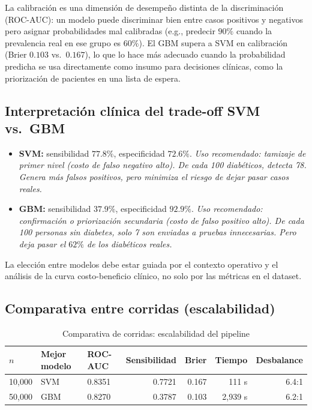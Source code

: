 \documentclass[12pt,a4paper]{article}
\begin{document}
La calibración es una dimensión de desempeño distinta de la discriminación (ROC-AUC): un modelo puede discriminar bien entre casos positivos y negativos pero asignar probabilidades mal calibradas (e.g., predecir $90\%$ cuando la prevalencia real en ese grupo es $60\%$). El GBM supera a SVM en calibración (Brier $0.103$ vs.\ $0.167$), lo que lo hace más adecuado cuando la probabilidad predicha se usa directamente como insumo para decisiones clínicas, como la priorización de pacientes en una lista de espera.

\subsection{Interpretación clínica del trade-off SVM vs.\ GBM}

\begin{infobox}
  \begin{itemize}[noitemsep]
    \item \textbf{SVM:} sensibilidad $77.8\%$, especificidad $72.6\%$.
    \textit{Uso recomendado: tamizaje de primer nivel (costo de falso negativo alto).
    De cada 100 diabéticos, detecta 78. Genera más falsos positivos, pero minimiza
    el riesgo de dejar pasar casos reales.}

    \item \textbf{GBM:} sensibilidad $37.9\%$, especificidad $92.9\%$.
    \textit{Uso recomendado: confirmación o priorización secundaria (costo de falso
    positivo alto). De cada 100 personas sin diabetes, solo 7 son enviadas a pruebas
    innecesarias. Pero deja pasar el $62\%$ de los diabéticos reales.}
  \end{itemize}
  La elección entre modelos debe estar guiada por el contexto operativo y el análisis
  de la curva costo-beneficio clínico, no solo por las métricas en el dataset.
\end{infobox}

\subsection{Comparativa entre corridas (escalabilidad)}

\begin{table}[H]
  \centering
  \caption{Comparativa de corridas: escalabilidad del pipeline}
  \label{tab:escalabilidad}
  \begin{tabular}{lllrrrr}
    \toprule
    \textbf{$n$} & \textbf{Mejor modelo} & \textbf{ROC-AUC} & \textbf{Sensibilidad} & \textbf{Brier} & \textbf{Tiempo} & \textbf{Desbalance}\\
    \midrule
    10{,}000 & SVM & 0.8351 & 0.7721 & 0.167 & 111 s & 6.4:1\\
    50{,}000 & GBM & 0.8270 & 0.3787 & 0.103 & 2{,}939 s & 6.2:1\\
    \bottomrule
  \end{tabular}
\end{table}
\end{document}
